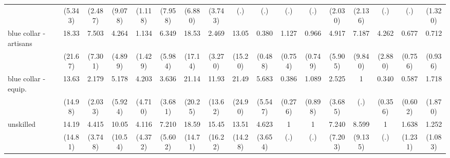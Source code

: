 {\begin{tabular}{l*{16}{c}}
                    &     (5.343)         &     (2.487)         &     (9.078)         &     (1.118)         &     (7.958)         &     (6.880)         &     (3.743)         &         (.)         &         (.)         &         (.)         &         (.)         &     (2.030)         &     (2.136)         &         (.)         &         (.)         &     (1.320)         \\
[1em]
blue collar - artisans&       18.33\sym{*}  &       7.503\sym{*}  &       4.264         &       1.134         &       6.349\sym{*}  &       18.53\sym{**} &       2.469         &       13.05\sym{*}  &       0.380         &       1.127         &       0.966         &       4.917         &       7.187         &       4.262\sym{*}  &       0.677         &       0.712         \\
                    &     (21.67)         &     (7.301)         &     (4.899)         &     (1.429)         &     (5.984)         &     (17.14)         &     (3.270)         &     (15.20)         &     (0.488)         &     (0.754)         &     (0.749)         &     (5.905)         &     (9.840)         &     (2.880)         &     (0.756)         &     (0.936)         \\
[1em]
blue collar - equip.&       13.63\sym{*}  &       2.179         &       5.178         &       4.203         &       3.636         &       21.14\sym{**} &       11.93\sym{*}  &       21.49\sym{**} &       5.683         &       0.386         &       1.089         &       2.525         &           1         &       0.340         &       0.587         &       1.718         \\
                    &     (14.98)         &     (2.033)         &     (5.924)         &     (4.710)         &     (3.681)         &     (20.25)         &     (13.62)         &     (24.90)         &     (5.547)         &     (0.276)         &     (0.898)         &     (3.685)         &         (.)         &     (0.356)         &     (0.602)         &     (1.870)         \\
[1em]
unskilled           &       14.19\sym{*}  &       4.415         &       10.05\sym{*}  &       4.116         &       7.210\sym{*}  &       18.59\sym{***}&       15.45\sym{**} &       13.51\sym{*}  &       4.623         &           1         &           1         &       7.240\sym{*}  &       8.599\sym{*}  &           1         &       1.638         &       1.252         \\
                    &     (14.81)         &     (3.748)         &     (10.54)         &     (4.372)         &     (5.602)         &     (14.71)         &     (16.22)         &     (14.28)         &     (3.654)         &         (.)         &         (.)         &     (7.203)         &     (9.135)         &         (.)         &     (1.231)         &     (1.083)         \\

\end{tabular}}
